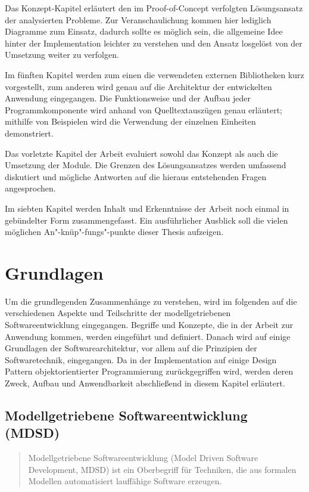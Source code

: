 \documentclass[12pt,oneside,a4paper,parskip]{scrbook}
\begin{document}
Das Konzept-Kapitel erläutert den im Proof-of-Concept verfolgten Lösungsansatz der analysierten Probleme. Zur Veranschaulichung kommen hier lediglich Diagramme zum Einsatz, dadurch sollte es möglich sein, die allgemeine Idee hinter der Implementation leichter zu verstehen und den Ansatz losgelöst von der Umsetzung weiter zu verfolgen.

Im fünften Kapitel werden zum einen die verwendeten externen Bibliotheken kurz vorgestellt, zum anderen wird genau auf die Architektur der entwickelten Anwendung eingegangen. Die Funktionsweise und der Aufbau jeder Programmkomponente wird anhand von Quelltextauszügen genau erläutert; mithilfe von Beispielen wird die Verwendung der einzelnen Einheiten demonstriert.

Das vorletzte Kapitel der Arbeit evaluiert sowohl das Konzept als auch die Umsetzung der Module. Die Grenzen des Lösungsansatzes werden umfassend diskutiert und mögliche Antworten auf die hieraus entstehenden Fragen angesprochen.

Im siebten Kapitel werden Inhalt und Erkenntnisse der Arbeit noch einmal in gebündelter Form zusammengefasst. Ein ausführlicher Ausblick soll die vielen möglichen An"-knüp"-fungs"-punkte dieser Thesis aufzeigen.

\chapter{Grundlagen}

Um die grundlegenden Zusammenhänge zu verstehen, wird im folgenden auf die verschiedenen Aspekte und Teilschritte der modellgetriebenen Softwareentwicklung eingegangen. Begriffe und Konzepte, die in der Arbeit zur Anwendung kommen, werden eingeführt und definiert. Danach wird auf einige Grundlagen der Softwarearchitektur, vor allem auf die Prinzipien der Softwaretechnik, eingegangen. Da in der Implementation auf einige Design Pattern objektorientierter Programmierung zurückgegriffen wird, werden deren Zweck, Aufbau und Anwendbarkeit abschließend in diesem Kapitel erläutert.

\section{Modellgetriebene Softwareentwicklung (MDSD)}

\begin{quote}\glqq Modellgetriebene Softwareentwicklung (Model Driven Software Development, MDSD) ist ein Oberbegriff für Techniken, die aus formalen Modellen automatisiert lauffähige Software erzeugen.\grqq \end{quote}
\end{document}
